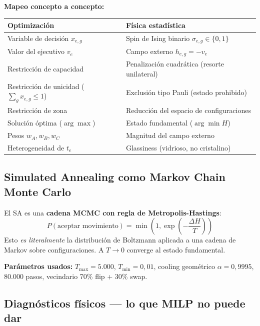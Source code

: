 \documentclass[11pt,a4paper]{article}
\newcommand{\rowamarillo}{\rowcolor{bcoamarilloclaro!30}}
\begin{document}
\textbf{Mapeo concepto a concepto:}
\begin{center}
\renewcommand{\arraystretch}{1.2}
\begin{tabular}{l l}
\toprule
\rowcolor{bconegro}\textbf{\color{bcoamarillo}Optimización} & \textbf{\color{bcoamarillo}Física estadística} \\
\midrule
\rowamarillo Variable de decisión $x_{e,g}$ & Spin de Ising binario $\sigma_{e,g} \in \{0,1\}$ \\
Valor del ejecutivo $v_e$ & Campo externo $h_{e,g} = -v_e$ \\
\rowamarillo Restricción de capacidad & Penalización cuadrática (resorte unilateral) \\
Restricción de unicidad ($\sum_g x_{e,g}\le1$) & Exclusión tipo Pauli (estado prohibido) \\
\rowamarillo Restricción de zona & Reducción del espacio de configuraciones \\
Solución óptima ($\arg\max$) & Estado fundamental ($\arg\min H$) \\
\rowamarillo Pesos $w_A, w_B, w_C$ & Magnitud del campo externo \\
Heterogeneidad de $t_e$ & Glassiness (vidrioso, no cristalino) \\
\bottomrule
\end{tabular}
\end{center}

\subsection{Simulated Annealing como Markov Chain Monte Carlo}

El SA es una \textbf{cadena MCMC con regla de Metropolis-Hastings}:
\begin{equation*}
P(\text{aceptar movimiento}) = \min\left(1, \exp\left(-\frac{\Delta H}{T}\right)\right)
\end{equation*}
Esto \emph{es literalmente} la distribución de Boltzmann aplicada a una cadena de Markov sobre configuraciones. A $T \to 0$ converge al estado fundamental.

\textbf{Parámetros usados:} $T_{\max}=5{.}000$, $T_{\min}=0{,}01$, cooling geométrico $\alpha=0{,}9995$, 80.000 pasos, vecindario 70\% flip + 30\% swap.

\subsection{Diagnósticos físicos --- lo que MILP no puede dar}
\end{document}
